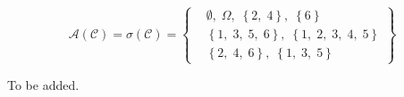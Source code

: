 \begin{list}{1.9.}{}
\item
  \[
    \mathcal{A}\left(\mathcal{C}\right) = \sigma\left(\mathcal{C}\right) =
    \left\{
      \begin{aligned}
        & \emptyset,\; \Omega,\; \left\{2,\; 4\right\},\; \left\{6\right\}    \\
        & \left\{1,\; 3,\; 5,\; 6\right\},\; \left\{1,\; 2,\; 3,\; 4,\; 5\right\}    \\
        & \left\{2,\; 4,\; 6\right\},\; \left\{1,\; 3,\; 5\right\}
      \end{aligned}
    \right\}
  \]
  
\item To be added.
\end{list}

